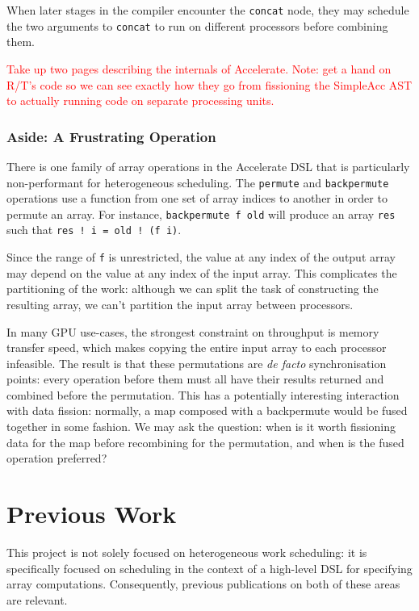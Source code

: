 \documentclass[a4paper,12pt]{article}
\newcommand{\red}[1]{\textcolor{red}{#1}}
\newcommand{\icf}[1]{\mbox{\texttt{#1}}} %
\begin{document}
When later stages in the compiler encounter the \icf{concat} node, they may schedule the two arguments to \icf{concat} to run on different processors before combining them.

\red{Take up two pages describing the internals of Accelerate. Note: get a hand on R/T's code so we can see exactly how they go from fissioning the SimpleAcc AST to actually running code on separate processing units.}

\subsubsection*{Aside: A Frustrating Operation}
There is one family of array operations in the Accelerate DSL that is particularly non-performant for heterogeneous scheduling.
The \icf{permute} and \icf{backpermute} operations use a function from one set of array indices to another in order to permute an array.
For instance, \icf{backpermute\ f\ old} will produce an array \icf{res} such that \icf{res\ !\ i =\ old !\ (f\ i)}.

Since the range of \icf{f} is unrestricted, the value at any index of the output array may depend on the value at any index of the input array.
This complicates the partitioning of the work: although we can split the task of constructing the resulting array, we can't partition the input array between processors.

In many GPU use-cases, the strongest constraint on throughput is memory transfer speed, which makes copying the entire input array to each processor infeasible.
The result is that these permutations are \textit{de facto} synchronisation points: every operation before them must all have their results returned and combined before the permutation.
This has a potentially interesting interaction with data fission: normally, a map composed with a backpermute would be fused together in some fashion.
We may ask the question: when is it worth fissioning data for the map before recombining for the permutation, and when is the fused operation preferred?

\section{Previous Work}

This project is not solely focused on heterogeneous work scheduling: it is specifically focused on scheduling in the context of a high-level DSL for specifying array computations.
Consequently, previous publications on both of these areas are relevant.
\end{document}

